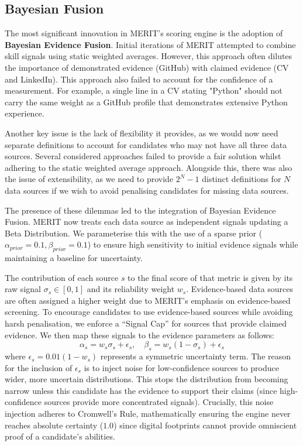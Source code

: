 \subsection{Bayesian Fusion}
\label{subsec:bayesian-fusion}
The most significant innovation in MERIT's scoring engine is the adoption of \textbf{Bayesian Evidence Fusion}.
Initial iterations of MERIT attempted to combine skill signals using static weighted averages. However, this approach often dilutes
the importance of demonstrated evidence (GitHub) with claimed evidence (CV and LinkedIn). This approach also failed to account for the
confidence of a measurement. For example, a single line in a CV stating "Python" should not carry the same weight as a GitHub profile
that demonstrates extensive Python experience.

Another key issue is the lack of flexibility it provides, as we would now need separate definitions to account for candidates who may not
have all three data sources. Several considered approaches failed to provide a fair solution whilst adhering to the static weighted average
approach. Alongside this, there was also the issue of extensibility, as we need to provide $2^N - 1$ distinct definitions for $N$ data sources if
we wish to avoid penalising candidates for missing data sources.

The presence of these dilemmas led to the integration of Bayesian Evidence Fusion. MERIT now treats each
data source as independent signals updating a Beta Distribution. We parameterise this with the use of a sparse prior
($\alpha_{prior} = 0.1, \beta_{prior} = 0.1$) to ensure high sensitivity to initial evidence signals while maintaining a baseline for uncertainty.

The contribution of each source $s$ to the final score of that metric is given by its raw signal $\sigma_s \in [0, 1]$ and its reliability weight $w_s$.
Evidence-based data sources are often assigned a higher weight due to MERIT's emphasis on evidence-based screening. To encourage candidates to
use evidence-based sources while avoiding harsh penalisation, we enforce a ``Signal Cap'' for sources that provide claimed evidence.
We then map these signals to the evidence parameters as follows:
\begin{equation}
  \alpha_s = w_s \sigma_s + \epsilon_s, \quad \beta_s = w_s (1 - \sigma_s) + \epsilon_s
\end{equation}
where $\epsilon_s = 0.01(1 - w_s)$ represents a symmetric uncertainty term. The reason for the inclusion of $\epsilon_s$ is to inject noise for
low-confidence sources to produce wider, more uncertain distributions. This stops the distribution from becoming narrow unless this candidate has the
evidence to support their claims (since high-confidence sources provide more concentrated signals). Crucially, this noise injection adheres to Cromwell's Rule, mathematically ensuring the engine never reaches absolute certainty ($1.0$) since digital footprints cannot provide omniscient proof of a candidate's abilities.

